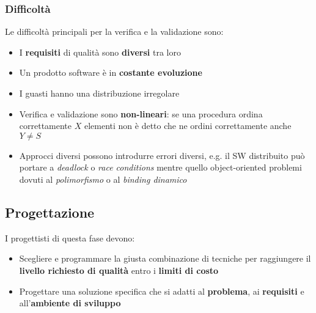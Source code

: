 \subsubsection{Difficoltà}
Le difficoltà principali per la verifica e la validazione sono:
\begin{itemize}
	\item I \textbf{requisiti} di qualità sono \textbf{diversi} tra loro
	\item Un prodotto software è in \textbf{costante evoluzione}
	\item I guasti hanno una distribuzione irregolare
	\item Verifica e validazione sono \textbf{non-lineari}: se una procedura ordina correttamente $X$ elementi non è detto che ne ordini correttamente anche $Y \neq S$
	\item Approcci diversi possono introdurre errori diversi, e.g. il SW distribuito può portare a \textit{deadlock} o \textit{race conditions} mentre quello object-oriented problemi dovuti al \textit{polimorfismo} o al \textit{binding dinamico}
\end{itemize}

\subsection{Progettazione}
I progettisti di questa fase devono:
\begin{itemize}
	\item Scegliere e programmare la giusta combinazione di tecniche per raggiungere il \textbf{livello richiesto di qualità} entro i \textbf{limiti di costo}
	\item Progettare una soluzione specifica che si adatti al \textbf{problema}, ai \textbf{requisiti} e all'\textbf{ambiente di sviluppo}
\end{itemize}

